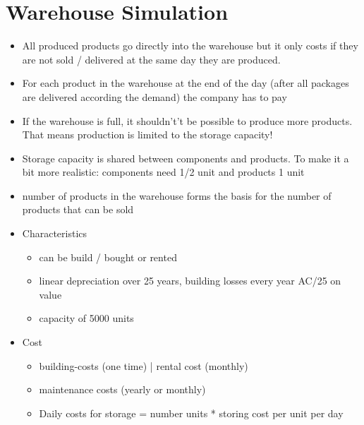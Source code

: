 \section{Warehouse Simulation}
\begin{itemize}
    \item All produced products go directly into the warehouse but it only costs if they are not sold / delivered at the same day they are produced.
    \item For each product in the warehouse at the end of the day (after all packages are delivered according the demand) the company has to pay
    \item If the warehouse is full, it shouldn't’t be possible to produce more products. That means production is limited to the storage capacity! 
    \item Storage capacity is shared between components and products. To make it a bit more realistic: components need 1/2 unit and products 1 unit
    \item number of products in the warehouse forms the basis for the number of products that can be sold
    \item Characteristics 
    \begin{itemize}
        \item can be build / bought or rented
        \item linear depreciation over 25 years, building losses every year AC/25 on value 
        \item capacity of 5000 units
    \end{itemize}
    \item Cost 
    \begin{itemize}
        \item building-costs (one time) | rental cost (monthly)
        \item maintenance costs (yearly or monthly) 
        \item Daily costs for storage = number units * storing cost per unit per day
    \end{itemize}
\end{itemize}